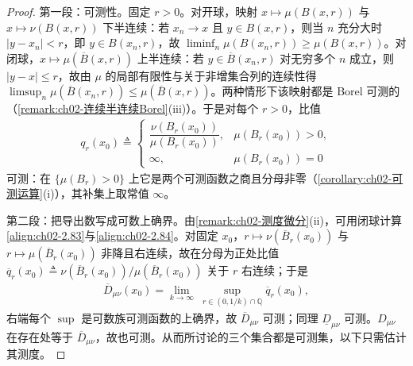\documentclass[../../main.tex]{subfiles}%
\begin{document}
\begin{proof}
第一段：可测性。固定 $r>0$。对开球，映射 $x\mapsto\mu(B(x,r))$ 与 $x\mapsto\nu(B(x,r))$ 下半连续：若 $x_n\to x$ 且 $y\in B(x,r)$，则当 $n$ 充分大时 $|y-x_n|<r$，即 $y\in B(x_n,r)$，故 $\liminf_n\mu(B(x_n,r))\geqslant\mu(B(x,r))$。对闭球，$x\mapsto\mu(\overline{B}(x,r))$ 上半连续：若 $y\in\overline{B}(x_n,r)$ 对无穷多个 $n$ 成立，则 $|y-x|\leqslant r$，故由 $\mu$ 的局部有限性与关于非增集合列的连续性得 $\limsup_n\mu(\overline{B}(x_n,r))\leqslant\mu(\overline{B}(x,r))$。两种情形下该映射都是 Borel 可测的（\cref{remark:ch02-连续半连续Borel}(iii)）。于是对每个 $r>0$，比值
\begin{align*}
q_r(x_0)\triangleq
\begin{cases}
\dfrac{\nu(B_r(x_0))}{\mu(B_r(x_0))}, & \mu(B_r(x_0))>0,\\
\infty, & \mu(B_r(x_0))=0
\end{cases}
\end{align*}
可测：在 $\{\mu(B_r)>0\}$ 上它是两个可测函数之商且分母非零（\cref{corollary:ch02-可测运算}(i)），其补集上取常值 $\infty$。

第二段：把导出数写成可数上确界。由\cref{remark:ch02-测度微分}(ii)，可用闭球计算\eqref{align:ch02-2.83}与\eqref{align:ch02-2.84}。对固定 $x_0$，$r\mapsto\nu(\overline{B}_r(x_0))$ 与 $r\mapsto\mu(\overline{B}_r(x_0))$ 非降且右连续，故在分母为正处比值 $\overline{q}_r(x_0)\triangleq\nu(\overline{B}_r(x_0))/\mu(\overline{B}_r(x_0))$ 关于 $r$ 右连续；于是
\begin{align*}
\overline{D}_{\mu\nu}(x_0)=\lim_{k\to\infty}\ \sup_{r\in(0,1/k)\cap\mathbb{Q}}\overline{q}_r(x_0),
\end{align*}
右端每个 $\sup$ 是可数族可测函数的上确界，故 $\overline{D}_{\mu\nu}$ 可测；同理 $\underline{D}_{\mu\nu}$ 可测。$D_{\mu\nu}$ 在存在处等于 $\overline{D}_{\mu\nu}$，故也可测。从而所讨论的三个集合都是可测集，以下只需估计其测度。


\end{proof}
\end{document}
